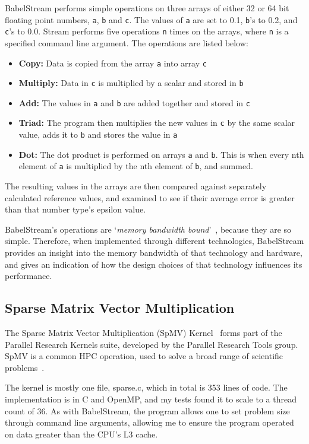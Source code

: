 BabelStream performs simple operations on three arrays of either 32 or 64 bit floating point numbers, \texttt{a}, \texttt{b} and \texttt{c}. The values of \texttt{a} are set to 0.1, \texttt{b}'s to 0.2, and \texttt{c}'s to 0.0. Stream performs five operations \texttt{n} times on the arrays, where \texttt{n} is a specified command line argument. The operations are listed below:
\begin{itemize}
  \item \textbf{Copy:} Data is copied from the array \texttt{a} into array \texttt{c}
  \item \textbf{Multiply:} Data in \texttt{c} is multiplied by a scalar and stored in \texttt{b}
  \item \textbf{Add:} The values in \texttt{a} and \texttt{b} are added together and stored in \texttt{c}
  \item \textbf{Triad:} The program then multiplies the new values in \texttt{c} by the same scalar value, adds it to \texttt{b} and stores the value in \texttt{a}
  \item \textbf{Dot:} The dot product is performed on arrays \texttt{a} and \texttt{b}. This is when every nth element of \texttt{a} is multiplied by the nth element of \texttt{b}, and summed.
\end{itemize}
The resulting values in the arrays are then compared against separately calculated reference values, and examined to see if their average error is greater than that number type's epsilon value.

BabelStream's operations are `\textit{memory bandwidth bound}'~\cite{BabelStream}, because they are so simple. Therefore, when implemented through different technologies, BabelStream provides an insight into the memory bandwidth of that technology and hardware, and gives an indication of how the design choices of that technology influences its performance.

\subsection{Sparse Matrix Vector Multiplication}

The Sparse Matrix Vector Multiplication (SpMV) Kernel~\cite{ParResSparse} forms part of the Parallel Research Kernels suite, developed by the Parallel Research Tools group. SpMV is a common HPC operation, used to solve a broad range of scientific problems~\cite{Sedaghati:2015, spMVGPU, DBLP:journals}.

The kernel is mostly one file, sparse.c, which in total is 353 lines of code. The implementation is in C and OpenMP, and my tests found it to scale to a thread count of 36. As with BabelStream, the program allows one to set problem size through command line arguments, allowing me to ensure the program operated on data greater than the CPU's L3 cache.

